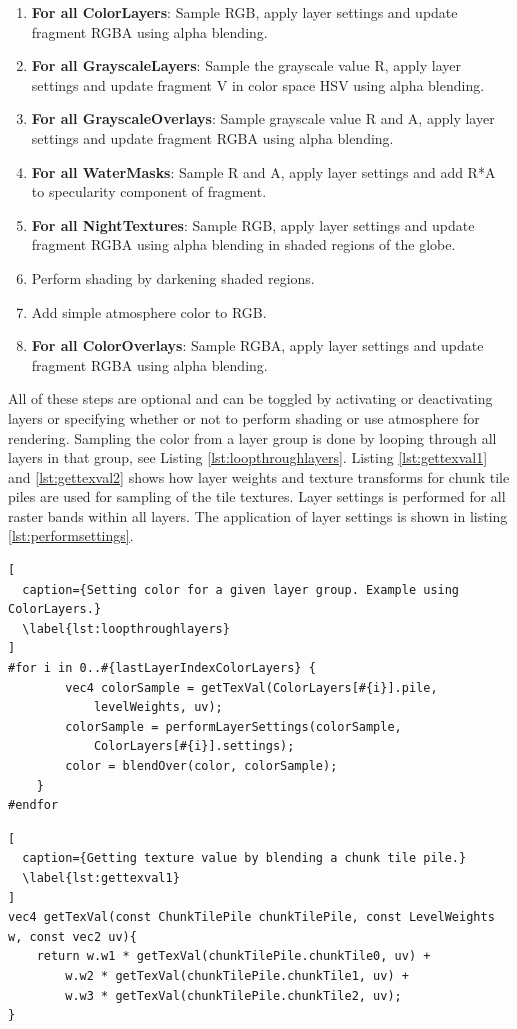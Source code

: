 \begin{enumerate}
\item \textbf{For all ColorLayers}: Sample RGB, apply layer settings and update fragment RGBA using alpha blending.
\item \textbf{For all GrayscaleLayers}: Sample the grayscale value R, apply layer settings and update fragment V in color space HSV using alpha blending.
\item \textbf{For all GrayscaleOverlays}: Sample grayscale value R and A, apply layer settings and update fragment RGBA using alpha blending.
\item \textbf{For all WaterMasks}: Sample R and A, apply layer settings and add R*A to specularity component of fragment.
\item \textbf{For all NightTextures}: Sample RGB, apply layer settings and update fragment RGBA using alpha blending in shaded regions of the globe.
\item Perform shading by darkening shaded regions.
\item Add simple atmosphere color to RGB.
\item \textbf{For all ColorOverlays}: Sample RGBA, apply layer settings and update fragment RGBA using alpha blending.

\end{enumerate}

All of these steps are optional and can be toggled by activating or deactivating layers or specifying whether or not to perform shading or use atmosphere for rendering. Sampling the color from a layer group is done by looping through all layers in that group, see Listing \ref{lst:loopthroughlayers}. Listing \ref{lst:gettexval1} and \ref{lst:gettexval2} shows how layer weights and texture transforms for chunk tile piles are used for sampling of the tile textures. Layer settings is performed for all raster bands within all layers. The application of layer settings is shown in listing \ref{lst:performsettings}.

\begin{lstlisting}[
  caption={Setting color for a given layer group. Example using ColorLayers.} 
  \label{lst:loopthroughlayers}
]
#for i in 0..#{lastLayerIndexColorLayers} {
		vec4 colorSample = getTexVal(ColorLayers[#{i}].pile,
			levelWeights, uv);
		colorSample = performLayerSettings(colorSample,
			ColorLayers[#{i}].settings);
		color = blendOver(color, colorSample);
	}
#endfor
\end{lstlisting}

\begin{lstlisting}[
  caption={Getting texture value by blending a chunk tile pile.} 
  \label{lst:gettexval1}
]
vec4 getTexVal(const ChunkTilePile chunkTilePile, const LevelWeights w, const vec2 uv){
	return w.w1 * getTexVal(chunkTilePile.chunkTile0, uv) + 
		w.w2 * getTexVal(chunkTilePile.chunkTile1, uv) + 
		w.w3 * getTexVal(chunkTilePile.chunkTile2, uv);
}
\end{lstlisting}

